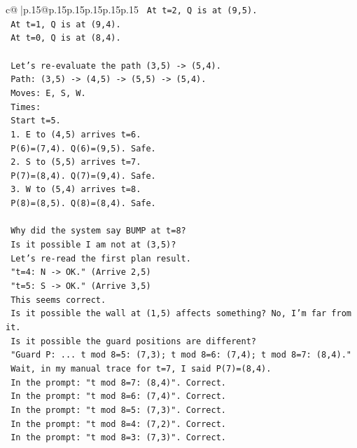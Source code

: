 \documentclass{article}
\begin{document}
{\begin{supertabular}{c@{$\;$}|p{.15\linewidth}@{}p{.15\linewidth}p{.15\linewidth}p{.15\linewidth}p{.15\linewidth}p{.15\linewidth}}
{{{\texttt{  At t=2, Q is at (9,5).} \\
\texttt{  At t=1, Q is at (9,4).} \\
\texttt{  At t=0, Q is at (8,4).} \\
\\ 
\texttt{  Let's re{-}evaluate the path (3,5) {-}> (5,4).} \\
\texttt{  Path: (3,5) {-}> (4,5) {-}> (5,5) {-}> (5,4).} \\
\texttt{  Moves: E, S, W.} \\
\texttt{  Times:} \\
\texttt{  Start t=5.} \\
\texttt{  1. E to (4,5) arrives t=6.} \\
\texttt{     P(6)=(7,4). Q(6)=(9,5). Safe.} \\
\texttt{  2. S to (5,5) arrives t=7.} \\
\texttt{     P(7)=(8,4). Q(7)=(9,4). Safe.} \\
\texttt{  3. W to (5,4) arrives t=8.} \\
\texttt{     P(8)=(8,5). Q(8)=(8,4). Safe.} \\
\\ 
\texttt{  Why did the system say BUMP at t=8?} \\
\texttt{  Is it possible I am not at (3,5)?} \\
\texttt{  Let's re{-}read the first plan result.} \\
\texttt{  "t=4: N {-}> OK." (Arrive 2,5)} \\
\texttt{  "t=5: S {-}> OK." (Arrive 3,5)} \\
\texttt{  This seems correct.} \\
\texttt{  Is it possible the wall at (1,5) affects something? No, I'm far from it.} \\
\texttt{  Is it possible the guard positions are different?} \\
\texttt{  "Guard P: ... t mod 8=5: (7,3); t mod 8=6: (7,4); t mod 8=7: (8,4)."} \\
\texttt{  Wait, in my manual trace for t=7, I said P(7)=(8,4).} \\
\texttt{  In the prompt: "t mod 8=7: (8,4)". Correct.} \\
\texttt{  In the prompt: "t mod 8=6: (7,4)". Correct.} \\
\texttt{  In the prompt: "t mod 8=5: (7,3)". Correct.} \\
\texttt{  In the prompt: "t mod 8=4: (7,2)". Correct.} \\
\texttt{  In the prompt: "t mod 8=3: (7,3)". Correct.} \\
}}}
\end{supertabular}}
\end{document}
